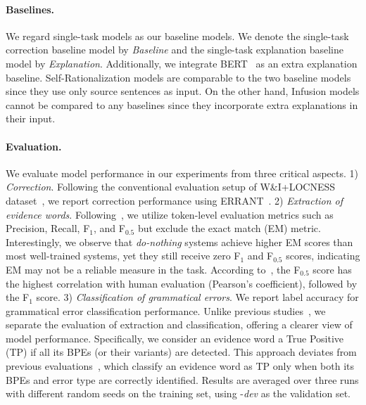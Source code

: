 \paragraph{Baselines.}
We regard single-task models as our baseline models. We denote the single-task correction baseline model by \textit{Baseline} and the single-task explanation baseline model by \textit{Explanation}. Additionally, we integrate BERT~\citep{devlin-etal-2019-bert} as an extra explanation baseline. Self-Rationalization models are comparable to the two baseline models since they use only source sentences as input. On the other hand, Infusion models cannot be compared to any baselines since they incorporate extra explanations in their input.


\paragraph{Evaluation.} We evaluate model performance in our experiments from three critical aspects. 1) \textit{Correction}. Following the conventional evaluation setup of W\&I+LOCNESS dataset~\citep{bryant-etal-2019-bea}, we report correction performance using ERRANT~\citep{bryant-etal-2017-automatic}.
2) \textit{Extraction of evidence words}. Following~\citet{fei-etal-2023-enhancing}, we utilize token-level evaluation metrics such as Precision, Recall, F$_1$, and F$_{0.5}$ but exclude the exact match (EM) metric. Interestingly, we observe that \textit{do-nothing} systems achieve higher EM scores than most well-trained systems, yet they still receive zero F$_1$ and F$_{0.5}$ scores, indicating EM may not be a reliable measure in the task. According to~\citet{fei-etal-2023-enhancing}, the F$_{0.5}$ score has the highest correlation with human evaluation (Pearson's coefficient), followed by the F$_1$ score. 3) \textit{Classification of grammatical errors}. We report label accuracy for grammatical error classification performance. Unlike previous studies~\citep{fei-etal-2023-enhancing}, we separate the evaluation of extraction and classification, offering a clearer view of model performance. Specifically, we consider an evidence word a True Positive (TP) if all its BPEs (or their variants) are detected. This approach deviates from previous evaluations~\citep{fei-etal-2023-enhancing}, which classify an evidence word as TP only when both its BPEs and error type are correctly identified. Results are averaged over three runs with different random seeds on the training set, using \Dataset{}-\textit{dev} as the validation set.

